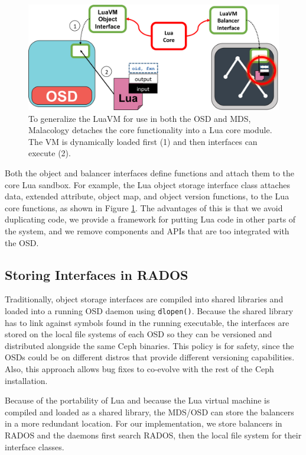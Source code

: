 \documentclass[10pt,twocolumn]{article}
\begin{document}
\begin{figure}[htbp]
\centering
\includegraphics{figures/cls-osd-mds.png}
\caption{To generalize the LuaVM for use in both the OSD and MDS,
Malacology detaches the core functionality into a Lua core module. The
VM is dynamically loaded first (1) and then interfaces can execute (2).
\label{fig:cls-osd-mds}}
\end{figure}

Both the object and balancer interfaces define functions and attach them
to the core Lua sandbox. For example, the Lua object storage interface
class attaches data, extended attribute, object map, and object version
functions, to the Lua core functions, as shown in Figure
\ref{fig:cls-osd-mds}. The advantages of this is that we avoid
duplicating code, we provide a framework for putting Lua code in other
parts of the system, and we remove components and APIs that are too
integrated with the OSD.

\subsection{Storing Interfaces in
RADOS}\label{storing-interfaces-in-rados}

Traditionally, object storage interfaces are compiled into shared
libraries and loaded into a running OSD daemon using \texttt{dlopen()}.
Because the shared library has to link against symbols found in the
running executable, the interfaces are stored on the local file systems
of each OSD so they can be versioned and distributed alongside the same
Ceph binaries. This policy is for safety, since the OSDs could be on
different distros that provide different versioning capabilities. Also,
this approach allows bug fixes to co-evolve with the rest of the Ceph
installation.

Because of the portability of Lua and because the Lua virtual machine is
compiled and loaded as a shared library, the MDS/OSD can store the
balancers in a more redundant location. For our implementation, we store
balancers in RADOS and the daemons first search RADOS, then the local
file system for their interface classes.
\end{document}
